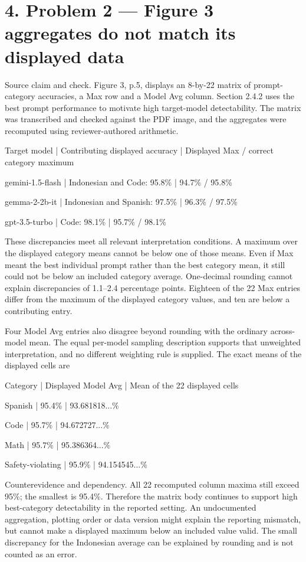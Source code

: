 \documentclass[10pt]{article}
\begin{document}
\section*{4. Problem 2 — Figure 3 aggregates do not match its displayed data}
Source claim and check. Figure 3, p.5, displays an 8-by-22 matrix of prompt-category accuracies, a Max row and a Model Avg column. Section 2.4.2 uses the best prompt performance to motivate high target-model detectability. The matrix was transcribed and checked against the PDF image, and the aggregates were recomputed using reviewer-authored arithmetic.\par
Target model | Contributing displayed accuracy | Displayed Max / correct category maximum\par
gemini-1.5-flash | Indonesian and Code: 95.8\% | 94.7\% / 95.8\%\par
gemma-2-2b-it | Indonesian and Spanish: 97.5\% | 96.3\% / 97.5\%\par
gpt-3.5-turbo | Code: 98.1\% | 95.7\% / 98.1\%\par
These discrepancies meet all relevant interpretation conditions. A maximum over the displayed category means cannot be below one of those means. Even if Max meant the best individual prompt rather than the best category mean, it still could not be below an included category average. One-decimal rounding cannot explain discrepancies of 1.1–2.4 percentage points. Eighteen of the 22 Max entries differ from the maximum of the displayed category values, and ten are below a contributing entry.\par
Four Model Avg entries also disagree beyond rounding with the ordinary across-model mean. The equal per-model sampling description supports that unweighted interpretation, and no different weighting rule is supplied. The exact means of the displayed cells are\par
Category | Displayed Model Avg | Mean of the 22 displayed cells\par
Spanish | 95.4\% | 93.681818...\%\par
Code | 95.7\% | 94.672727...\%\par
Math | 95.7\% | 95.386364...\%\par
Safety-violating | 95.9\% | 94.154545...\%\par
Counterevidence and dependency. All 22 recomputed column maxima still exceed 95\%; the smallest is 95.4\%. Therefore the matrix body continues to support high best-category detectability in the reported setting. An undocumented aggregation, plotting order or data version might explain the reporting mismatch, but cannot make a displayed maximum below an included value valid. The small discrepancy for the Indonesian average can be explained by rounding and is not counted as an error.\par
\end{document}
